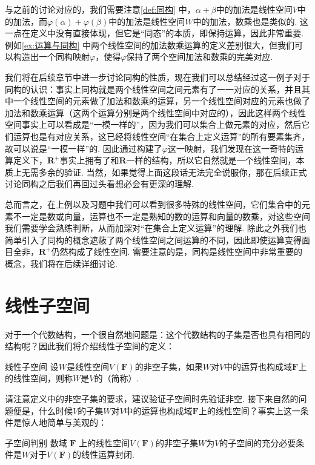 与之前的讨论对应的，我们需要注意\autoref{def:同构} 中，$\alpha+\beta$中的加法是线性空间$V$中的加法，而$\varphi(\alpha)+\varphi(\beta)$中的加法是线性空间$W$中的加法，数乘也是类似的. 这一点在定义中没有直接体现，但它是``同态''的本质，即保持运算，因此非常重要. 例如\autoref{ex:运算与同构} 中两个线性空间的加法数乘运算的定义差别很大，但我们可以构造出一个同构映射$\varphi$，使得$\varphi$保持了两个空间加法和数乘的完美对应.

我们将在后续章节中进一步讨论同构的性质，现在我们可以总结经过这一例子对于同构的认识：事实上同构就是两个线性空间之间元素有了一一对应的关系，并且其中一个线性空间的元素做了加法和数乘的运算，另一个线性空间对应的元素也做了加法和数乘运算（这两个运算分别是两个线性空间中对应的），因此这样两个线性空间事实上可以看成是``一模一样的''，因为我们可以集合上做元素的对应，然后它们运算也是有对应关系，这已经将线性空间``在集合上定义运算''的所有要素集齐，故可以说是``一模一样''的. 因此通过构建了$\varphi$这一映射，我们发现在这一奇特的运算定义下，$\mathbf{R}^+$事实上拥有了和$\mathbf{R}$一样的结构，所以它自然就是一个线性空间，本质上无需多余的验证. 当然，如果觉得上面这段话无法完全说服你，那在后续正式讨论同构之后我们再回过头看想必会有更深的理解.

总而言之，在上例以及习题中我们可以看到很多特殊的线性空间，它们集合中的元素不一定是数或向量，运算也不一定是熟知的数的运算和向量的数乘，对这些空间我们需要学会熟练判断，从而加深对``在集合上定义运算''的理解. 除此之外我们也简单引入了同构的概念遮蔽了两个线性空间之间运算的不同，因此即使运算变得面目全非，$\mathbf{R}^+$仍然构成了线性空间. 需要注意的是，同构是线性空间中非常重要的概念，我们将在后续详细讨论.

\section{线性子空间}

对于一个代数结构，一个很自然地问题是：这个代数结构的子集是否也具有相同的结构呢？因此我们将介绍线性子空间的定义：
\begin{definition}{线性子空间}{} 
    设$W$是线性空间$V(\mathbf{F})$的非空子集，如果$W$对$V$中的运算也构成域$\mathbf{F}$上的线性空间，则称$W$是$V$的（简称）.
\end{definition}

请注意定义中的非空子集的要求，建议验证子空间时先验证非空. 接下来自然的问题便是，什么时候$V$的子集$W$对$V$中的运算也构成域$\mathbf{F}$上的线性空间？事实上这一条件是惊人地简单与美观的：
\begin{theorem}{}{子空间判别}
    数域 $\mathbf{F}$ 上的线性空间$V(\mathbf{F})$的非空子集$W$为$V$的子空间的充分必要条件是$W$对于$V(\mathbf{F})$的线性运算封闭.
\end{theorem}

